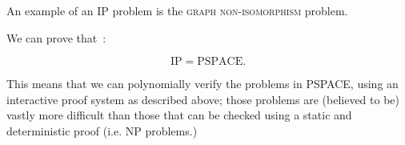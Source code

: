 An example of an IP problem is the \textsc{graph non-isomorphism} problem.

We can prove that~\cite{ipequalspspace}:
\begin{theorem}
    \begin{equation}
 \text{IP} = \text{PSPACE}.
    \end{equation}
\end{theorem}

This means that we can polynomially verify the problems in PSPACE, using an interactive proof system as described above; those problems are (believed to be) vastly more difficult than those that can be checked using a static and deterministic proof (i.e. NP problems.)



